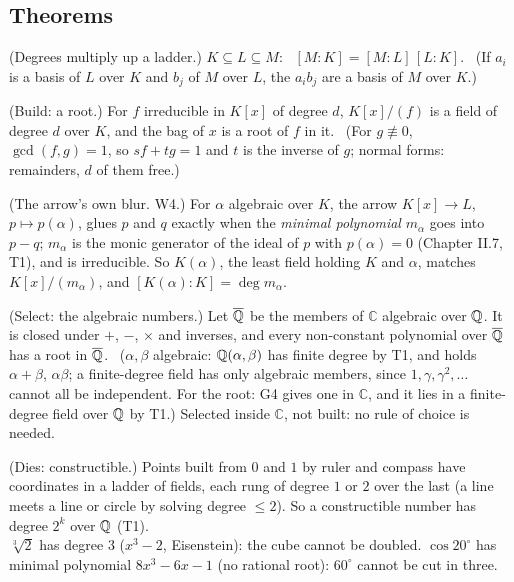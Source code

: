 \subsection*{Theorems}

\begin{lines}
\item[\lab{T1}] (Degrees multiply up a ladder.) $K \subseteq L \subseteq M$: \ $[M : K] = [M : L]\,[L : K]$. \ (If $a_i$ is a basis of $L$ over $K$ and $b_j$ of $M$ over $L$, the $a_i b_j$ are a basis of $M$ over $K$.)
\item[\lab{T2}] (Build: a root.) For $f$ irreducible in $K[x]$ of degree $d$, $K[x]/(f)$ is a field of degree $d$ over $K$, and the bag of $x$ is a root of $f$ in it. \ (For $g \not\equiv 0$, $\gcd(f, g) = 1$, so $sf + tg = 1$ and $t$ is the inverse of $g$; normal forms: remainders, $d$ of them free.)
\item[\lab{T3}] (The arrow's own blur. W4.) For $\alpha$ algebraic over $K$, the arrow $K[x] \to L$, $p \mapsto p(\alpha)$, glues $p$ and $q$ exactly when the \emph{minimal polynomial} $m_\alpha$ goes into $p - q$; $m_\alpha$ is the monic generator of the ideal of $p$ with $p(\alpha) = 0$ (Chapter II.7, T1), and is irreducible. So $K(\alpha)$, the least field holding $K$ and $\alpha$, matches $K[x]/(m_\alpha)$, and $[K(\alpha) : K] = \deg m_\alpha$.
\item[\lab{T4}] (Select: the algebraic numbers.) Let $\overline{\mathbb{Q}}$ be the members of $\mathbb{C}$ algebraic over $\mathbb{Q}$. It is closed under $+$, $-$, $\times$ and inverses, and every non-constant polynomial over $\overline{\mathbb{Q}}$ has a root in $\overline{\mathbb{Q}}$. \ ($\alpha, \beta$ algebraic: $\mathbb{Q}(\alpha, \beta)$ has finite degree by T1, and holds $\alpha + \beta$, $\alpha\beta$; a finite-degree field has only algebraic members, since $1, \gamma, \gamma^2, \dots$ cannot all be independent. For the root: G4 gives one in $\mathbb{C}$, and it lies in a finite-degree field over $\mathbb{Q}$ by T1.) Selected inside $\mathbb{C}$, not built: no rule of choice is needed.
\item[\lab{T5}] (Dies: constructible.) Points built from $0$ and $1$ by ruler and compass have coordinates in a ladder of fields, each rung of degree $1$ or $2$ over the last (a line meets a line or circle by solving degree $\le 2$). So a constructible number has degree $2^k$ over $\mathbb{Q}$ (T1). \\
$\sqrt[3]{2}$ has degree $3$ ($x^3 - 2$, Eisenstein): the cube cannot be doubled. $\cos 20^\circ$ has minimal polynomial $8x^3 - 6x - 1$ (no rational root): $60^\circ$ cannot be cut in three.

\end{lines}
